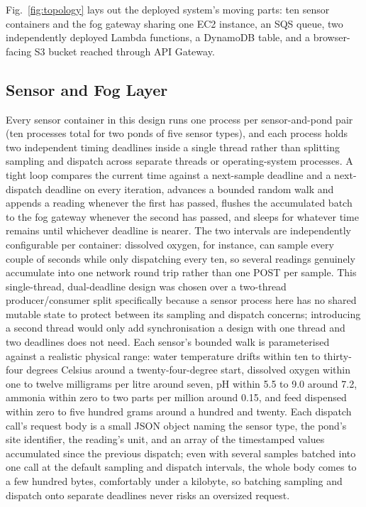 \documentclass[conference]{IEEEtran}
\begin{document}
Fig.~\ref{fig:topology} lays out the deployed system's moving parts: ten sensor containers and the fog gateway sharing one EC2 instance, an SQS queue, two independently deployed Lambda functions, a DynamoDB table, and a browser-facing S3 bucket reached through API Gateway.

\subsection{Sensor and Fog Layer}

Every sensor container in this design runs one process per sensor-and-pond pair (ten processes total for two ponds of five sensor types), and each process holds two independent timing deadlines inside a single thread rather than splitting sampling and dispatch across separate threads or operating-system processes. A tight loop compares the current time against a next-sample deadline and a next-dispatch deadline on every iteration, advances a bounded random walk and appends a reading whenever the first has passed, flushes the accumulated batch to the fog gateway whenever the second has passed, and sleeps for whatever time remains until whichever deadline is nearer. The two intervals are independently configurable per container: dissolved oxygen, for instance, can sample every couple of seconds while only dispatching every ten, so several readings genuinely accumulate into one network round trip rather than one POST per sample. This single-thread, dual-deadline design was chosen over a two-thread producer/consumer split specifically because a sensor process here has no shared mutable state to protect between its sampling and dispatch concerns; introducing a second thread would only add synchronisation a design with one thread and two deadlines does not need. Each sensor's bounded walk is parameterised against a realistic physical range: water temperature drifts within ten to thirty-four degrees Celsius around a twenty-four-degree start, dissolved oxygen within one to twelve milligrams per litre around seven, pH within 5.5 to 9.0 around 7.2, ammonia within zero to two parts per million around 0.15, and feed dispensed within zero to five hundred grams around a hundred and twenty. Each dispatch call's request body is a small JSON object naming the sensor type, the pond's site identifier, the reading's unit, and an array of the timestamped values accumulated since the previous dispatch; even with several samples batched into one call at the default sampling and dispatch intervals, the whole body comes to a few hundred bytes, comfortably under a kilobyte, so batching sampling and dispatch onto separate deadlines never risks an oversized request.
\end{document}
